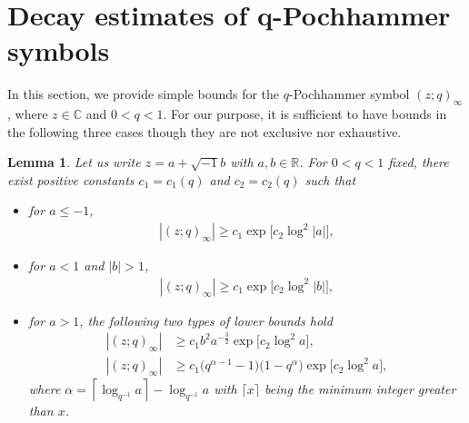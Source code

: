 \documentclass[11pt]{article}
\numberwithin{equation}{section}
\numberwithin{equation}{section}
\newtheorem{Lemma}[Theorem]{Lemma}
\def\a{\alpha}
\def\C{\mathbb{C}}
\def\i{\infty}
\def\R{\mathbb{R}}
\begin{document}
\section[Decay estimates of q-Pochhammer symbols]{Decay estimates of $\boldsymbol{q}$-Pochhammer symbols}
\label{ac}
In this section, we provide simple bounds for
the $q$-Pochhammer symbol $(z;q)_{\i}$, where
$z\in\C$ and $0<q<1$. For our purpose, it is sufficient
to have bounds in the following three cases though
they are not exclusive nor exhaustive.
\begin{Lemma}\label{lc1}
 Let us write $z=a+\sqrt{-1}b$ with $a,b\in\R$.
 For $0<q<1$ fixed, there exist positive constants
 $c_1=c_1(q)$ and $c_2=c_2(q)$ such that
 \begin{itemize}\itemsep=0pt
 \item[\rm{(i)}] for $a\le -1$,
 \begin{align}
 \label{lc1-1}
 |(z;q)_\i|\ge c_1 \exp \big[c_2\log^2 |a|\big],
 \end{align}
 \item[\rm{(ii)}] for $a<1$ and $|b|>1$,
 \begin{align}
 \label{lc1-2}
 |(z;q)_\i|\ge c_1 \exp\big[c_2\log^2 |b|\big],
 \end{align}
 \item[\rm{(iii)}] for $a>1$,
 the following two types of lower bounds
 hold
 \begin{align}
 \label{lc1-3}
 |(z;q)_\i|
 &\ge c_1 b^2 a^{-\frac32}
 \exp\big[c_2\log^2 a\big],\\
 \label{lc1-3'}
 |(z;q)_\i|
 &\ge c_1 \big(q^{\a-1}-1\big)\big(1-q^{\a}\big)
 \exp\big[c_2\log^2 a\big],
 \end{align}
 where $\a=\left\lceil \log_{q^{-1}}a\right\rceil-\log_{q^{-1}}a$
 with $\lceil x\rceil$ being the minimum integer
 greater than $x$.
 \end{itemize}
\end{Lemma}
\end{document}
